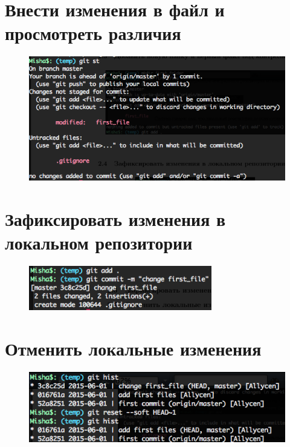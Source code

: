 \documentclass[utf8x, 12pt]{G7-32}
\begin{document}
\section{Внести изменения в файл и просмотреть различия}

\begin{figure}[hhh!]
	\begin{center}
		\includegraphics[width=12cm]{img/5}
	\end{center}
\end{figure}


\section{Зафиксировать изменения в локальном репозитории}

\begin{figure}[hhh!]
	\begin{center}
		\includegraphics[width=8cm]{img/6}
	\end{center}
\end{figure}

\newpage

\section{Отменить локальные изменения}

\begin{figure}[hhh!]
	\begin{center}
		\includegraphics[width=12cm]{img/8}
	\end{center}
\end{figure}
\end{document}
